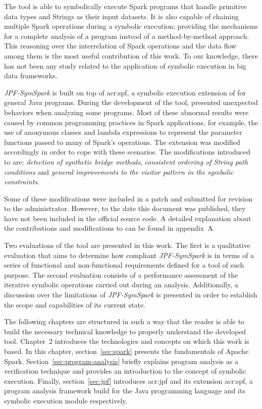 The tool is able to symbolically execute Spark programs that handle primitive data types and Strings as their input datasets. It is also capable of chaining multiple Spark operations during a symbolic execution; providing the mechanisms for a complete analysis of a program instead of a method-by-method approach. This reasoning over the interrelation of Spark operations and the data flow among them is the most useful contribution of this work. To our knowledge, there has not been any study related to the application of symbolic execution in big data frameworks.

\textit{JPF-SymSpark} is built on top of \acrfull{acr:spf}, a symbolic execution extension of \jpf{} for general Java programs. During the development of the tool, \spf{} presented unexpected behaviors when analyzing some programs. Most of these abnormal results were caused by common programming practices in Spark applications, for example, the use of anonymous classes and lambda expressions to represent the parameter functions passed to many of Spark's operations. The \spf{} extension was modified accordingly in order to cope with these scenarios. The modifications introduced to \spf{} are: \textit{detection of synthetic bridge methods}, \textit{consistent ordering of String path conditions} and \textit{general improvements to the visitor pattern in the symbolic constraints}.

Some of these modifications were included in a patch and submitted for revision to the \spf{} administrator. However, to the date this document was published, they have not been included in the official source code. A detailed explanation about the contributions and modifications to \spf{} can be found in appendix~A.

Two evaluations of the tool are presented in this work. The first is a qualitative evaluation that aims to determine how compliant \textit{JPF-SymSpark} is in terms of a series of functional and non-functional requirements defined for a tool of such purpose. The second evaluation consists of a performance assessment of the iterative symbolic operations carried out during an analysis. Additionally, a discussion over the limitations of \textit{JPF-SymSpark} is presented in order to establish the scope and capabilities of its current state.


The following chapters are structured in such a way that the reader is able to build the necessary technical knowledge to properly understand the developed tool. Chapter~2 introduces the technologies and concepts on which this work is based. In this chapter, section~\ref{sec:spark} presents the fundamentals of Apache Spark. Section~\ref{sec:program-analysis} briefly explains program analysis as a verification technique and provides an introduction to the concept of symbolic execution. Finally, section~\ref{sec:jpf} introduces \acrlong{acr:jpf} and its extension \acrlong{acr:spf}, a program analysis framework build for the Java programming language and its symbolic execution module respectively.

